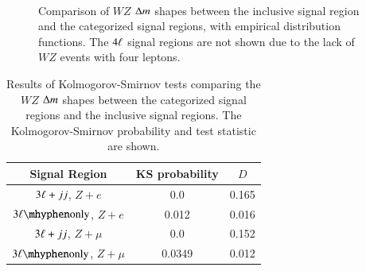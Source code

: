 \begin{figure}[htbp]
{		
	} \\
	\caption{Comparison of $WZ$ $\Delta m$ shapes between the inclusive signal region and the categorized signal regions, with empirical distribution functions. The $4\ell$ signal regions are not shown due to the lack of $WZ$ events with four leptons.}
	\label{fig:inclusive-KS-tests-WZ}
\end{figure}

 \begin{table}[htbp]
	\centering
	\begin{tabular}{ccc}
		Signal Region & KS probability & $D$ \\
		\hline
		$3\ell+jj$, $Z+e$ & 0.0 & 0.165 \\
		$\threelo$, $Z+e$ & 0.012 & 0.016 \\
		$3\ell+jj$, $Z+\mu$ & 0.0 & 0.152 \\
		$\threelo$, $Z+\mu$ & 0.0349 & 0.012
	\end{tabular}
	\caption{Results of Kolmogorov-Smirnov tests comparing the $WZ$ $\Delta m$ shapes between the categorized signal regions and the inclusive signal regions. The Kolmogorov-Smirnov probability and test statistic are shown.}
	\label{table:inclusive-KS-tests-WZ}
\end{table}

